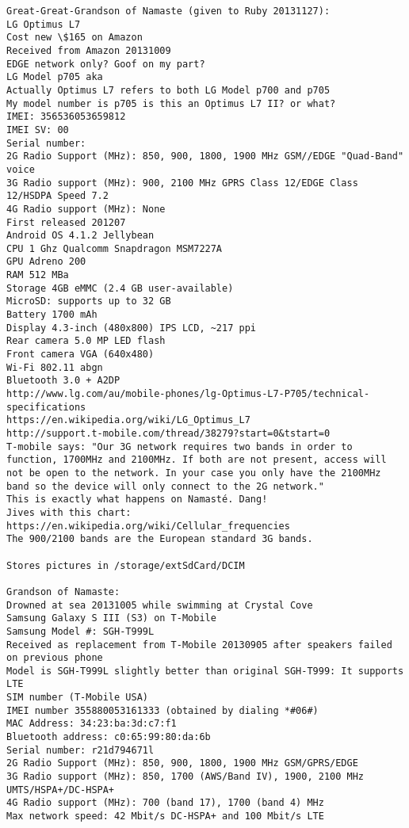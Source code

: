 \documentclass[12pt,twoside]{article}
\begin{document}
\begin{verbatim}
Great-Great-Grandson of Namaste (given to Ruby 20131127):
LG Optimus L7
Cost new \$165 on Amazon
Received from Amazon 20131009
EDGE network only? Goof on my part?
LG Model p705 aka 
Actually Optimus L7 refers to both LG Model p700 and p705
My model number is p705 is this an Optimus L7 II? or what?
IMEI: 356536053659812
IMEI SV: 00
Serial number: 
2G Radio Support (MHz): 850, 900, 1800, 1900 MHz GSM//EDGE "Quad-Band" voice
3G Radio support (MHz): 900, 2100 MHz GPRS Class 12/EDGE Class 12/HSDPA Speed 7.2
4G Radio support (MHz): None
First released 201207
Android OS 4.1.2 Jellybean
CPU 1 Ghz Qualcomm Snapdragon MSM7227A
GPU Adreno 200
RAM 512 MBa
Storage 4GB eMMC (2.4 GB user-available)
MicroSD: supports up to 32 GB
Battery 1700 mAh
Display 4.3-inch (480x800) IPS LCD, ~217 ppi
Rear camera 5.0 MP LED flash
Front camera VGA (640x480)
Wi-Fi 802.11 abgn
Bluetooth 3.0 + A2DP
http://www.lg.com/au/mobile-phones/lg-Optimus-L7-P705/technical-specifications
https://en.wikipedia.org/wiki/LG_Optimus_L7
http://support.t-mobile.com/thread/38279?start=0&tstart=0
T-mobile says: "Our 3G network requires two bands in order to
function, 1700MHz and 2100MHz. If both are not present, access will
not be open to the network. In your case you only have the 2100MHz
band so the device will only connect to the 2G network."
This is exactly what happens on Namasté. Dang!
Jives with this chart: https://en.wikipedia.org/wiki/Cellular_frequencies
The 900/2100 bands are the European standard 3G bands. 

Stores pictures in /storage/extSdCard/DCIM

Grandson of Namaste:
Drowned at sea 20131005 while swimming at Crystal Cove
Samsung Galaxy S III (S3) on T-Mobile
Samsung Model #: SGH-T999L
Received as replacement from T-Mobile 20130905 after speakers failed on previous phone
Model is SGH-T999L slightly better than original SGH-T999: It supports LTE
SIM number (T-Mobile USA) 
IMEI number 355880053161333 (obtained by dialing *#06#)
MAC Address: 34:23:ba:3d:c7:f1
Bluetooth address: c0:65:99:80:da:6b
Serial number: r21d794671l
2G Radio Support (MHz): 850, 900, 1800, 1900 MHz GSM/GPRS/EDGE
3G Radio support (MHz): 850, 1700 (AWS/Band IV), 1900, 2100 MHz UMTS/HSPA+/DC-HSPA+
4G Radio support (MHz): 700 (band 17), 1700 (band 4) MHz
Max network speed: 42 Mbit/s DC-HSPA+ and 100 Mbit/s LTE


\end{verbatim}
\end{document}
